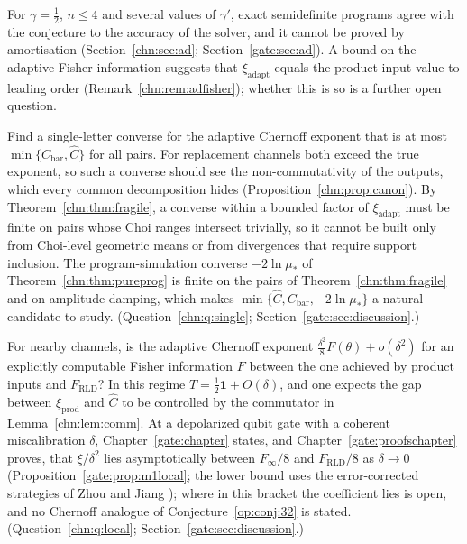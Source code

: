 \noindent For $\gamma=\frac12$, $n\le4$ and several values of $\gamma'$, exact semidefinite programs agree with the conjecture to the accuracy of the solver, and it cannot be proved by amortisation (Section~\ref{chn:sec:ad}; Section~\ref{gate:sec:ad}). A bound on the adaptive Fisher information suggests that $\xi_{\mathrm{adapt}}$ equals the product-input value to leading order (Remark~\ref{chn:rem:adfisher}); whether this is so is a further open question.

\begin{problem}\label{op:prob:single letter}
Find a single-letter converse for the adaptive Chernoff exponent that is at most $\min\{C_{\mathrm{bar}},\widehat C\}$ for all pairs. For replacement channels both exceed the true exponent, so such a converse should see the non-commutativity of the outputs, which every common decomposition hides (Proposition~\ref{chn:prop:canon}). By Theorem~\ref{chn:thm:fragile}, a converse within a bounded factor of $\xi_{\mathrm{adapt}}$ must be finite on pairs whose Choi ranges intersect trivially, so it cannot be built only from Choi-level geometric means or from divergences that require support inclusion. The program-simulation converse $-2\ln\mu_*$ of Theorem~\ref{chn:thm:pureprog} is finite on the pairs of Theorem~\ref{chn:thm:fragile} and on amplitude damping, which makes $\min\{\widehat C,C_{\mathrm{bar}},-2\ln\mu_*\}$ a natural candidate to study. (Question~\ref{chn:q:single}; Section~\ref{gate:sec:discussion}.)
\end{problem}

\begin{problem}\label{op:prob:local chernoff}
For nearby channels, is the adaptive Chernoff exponent $\frac{\delta^2}8F(\theta)+o(\delta^2)$ for an explicitly computable Fisher information $F$ between the one achieved by product inputs and $F_{\mathrm{RLD}}$? In this regime $T=\frac12\mathbf 1+O(\delta)$, and one expects the gap between $\xi_{\mathrm{prod}}$ and $\widehat C$ to be controlled by the commutator in Lemma~\ref{chn:lem:comm}. At a depolarized qubit gate with a coherent miscalibration $\delta$, Chapter~\ref{gate:chapter} states, and Chapter~\ref{gate:proofschapter} proves, that $\xi/\delta^2$ lies asymptotically between $F_\infty/8$ and $F_{\mathrm{RLD}}/8$ as $\delta\to0$ (Proposition~\ref{gate:prop:m1local}; the lower bound uses the error-corrected strategies of Zhou and Jiang \cite{ZhouJiang2021}); where in this bracket the coefficient lies is open, and no Chernoff analogue of Conjecture~\ref{op:conj:32} is stated. (Question~\ref{chn:q:local}; Section~\ref{gate:sec:discussion}.)
\end{problem}

